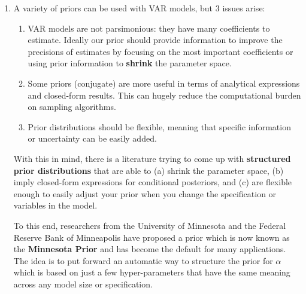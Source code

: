 \begin{enumerate}
\item A variety of priors can be used with VAR models, but 3 issues arise:
\begin{enumerate}
    \item VAR models are not parsimonious: they have many coefficients to estimate.
    Ideally our prior should provide information to improve the precisions of estimates by focusing on the most important coefficients
    or using prior information to \textbf{shrink} the parameter space.
    \item Some priors (conjugate) are more useful in terms of analytical expressions and closed-form results.
    This can hugely reduce the computational burden on sampling algorithms.
    \item Prior distributions should be flexible, meaning that specific information or uncertainty can be easily added.
\end{enumerate}
With this in mind, there is a literature trying to come up with \textbf{structured prior distributions} that are able to
(a) shrink the parameter space,
(b) imply closed-form expressions for conditional posteriors, and
(c) are flexible enough to easily adjust your prior when you change the specification or variables in the model.

To this end, researchers from the University of Minnesota and the Federal Reserve Bank of Minneapolis have proposed a prior
which is now known as the \textbf{Minnesota Prior} and has become the default for many applications.
The idea is to put forward an automatic way to structure the prior for \(\alpha \)
which is based on just a few hyper-parameters that have the same meaning across any model size or specification.


\end{enumerate}
